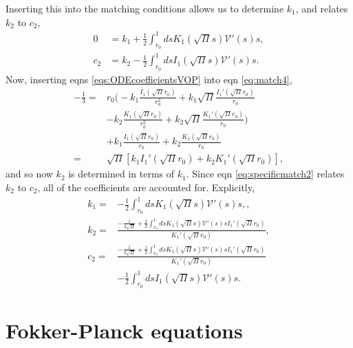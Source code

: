 \documentclass[twocolumn,amsmath,amssymb,aps]{revtex4-1}%
\begin{document}
Inserting this into the matching conditions allows us to determine $k_1$, and
relates $k_2$ to $c_2$,
\begin{subequations}
  \label{eqs:specificmatching}
  \begin{align}
    0 &= k_1 + \frac{1}{2}\int_{r_0}^1dsK_1(\sqrt{\Pi}s)
        \mathcal{V}'(s)s,\label{eq:specificmatch1}\\
    c_2  &= k_2 - \frac{1}{2}\int_{r_0}^1dsI_1(\sqrt{\Pi}s)
           \mathcal{V}'(s)s\label{eq:specificmatch2}.
  \end{align}
\end{subequations}
Now, inserting eqns \ref{eqs:ODEcoefficientsVOP} into eqn \ref{eq:match4},
\begin{align}
  -\frac{1}{3}=
  &r_0\bigg(-k_1\frac{I_1(\sqrt{\Pi}r_0)}{r_0^2}+k_1\sqrt{\Pi}
    \frac{I_1'(\sqrt{\Pi}r_0)}{r_0}\nonumber\\
  &-k_2\frac{K_1(\sqrt{\Pi}r_0)}{r_0^2}+k_2\sqrt{\Pi}
    \frac{K_1'(\sqrt{\Pi}r_0)}{r_0}\bigg)\nonumber\\
  & +k_1\frac{I_1(\sqrt{\Pi}r_0)}{r_0} + k_2\frac{K_1(\sqrt{\Pi}r_0)}{r_0}
    \nonumber\\
  =&\sqrt{\Pi}[k_1I_1'(\sqrt{\Pi}r_0)+k_2K_1'(\sqrt{\Pi}r_0)],
\end{align}
and so now $k_2$ is determined in terms of $k_1$. Since eqn
\ref{eq:specificmatch2} relates $k_2$ to $c_2$, all of the coefficients are
accounted for. Explicitly,
\begin{align}
  k_1 =& -\frac{1}{2}\int_{r_0}^1dsK_1(\sqrt{\Pi}s)
         \mathcal{V}'(s)s,\label{eq:k1},\\
  k_2 =& \frac{-\frac{1}{3\sqrt{\Pi}}+\frac{1}{2}\int_{r_0}^1ds
         K_1(\sqrt{\Pi}s)\mathcal{V}'(s)sI_1'(\sqrt{\Pi}r_0)}
         {K_1'(\sqrt{\Pi}r_0)}\label{eq:k2},\\
  c_2 =& \frac{-\frac{1}{3\sqrt{\Pi}}+\frac{1}{2}\int_{r_0}^1ds
         K_1(\sqrt{\Pi}s)\mathcal{V}'(s)sI_1'(\sqrt{\Pi}r_0)}
         {K_1'(\sqrt{\Pi}r_0)}\nonumber\\
       &-\frac{1}{2}\int_{r_0}^1dsI_1(\sqrt{\Pi}s)
         \mathcal{V}'(s)s\label{eq:c2}.
\end{align}



\appendix

\section{Fokker-Planck equations\label{app:fokkerplanck}}
\end{document}

